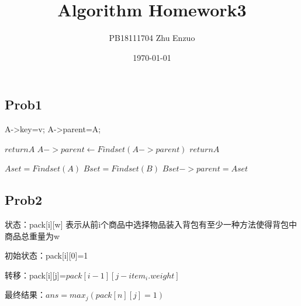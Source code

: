 \documentclass{ctexart}
\title{Algorithm Homework3}
\author{PB18111704 Zhu Enzuo}
\date{\today}
\begin{document}
\maketitle
\subsection{Prob1}
\begin{algorithm}
    \begin{algorithmic}[1]
        \State A->key=v;
        \State A->parent=A;
    \EndProcedure
    \end{algorithmic}
\end{algorithm}
\begin{algorithm}
    \begin{algorithmic}
                \State $return A$
            \Else
                \State $A->parent\gets Findset(A->parent)$
                \State $return A$
            \EndIf
        \EndProcedure
    \end{algorithmic}
\end{algorithm}
\begin{algorithm}
    \begin{algorithmic}
            \State $Aset=Findset(A)$
            \State $Bset=Findset(B)$
            \State $Bset->parent=Aset$
        \EndProcedure
    \end{algorithmic}
\end{algorithm}
\subsection{Prob2}

状态：pack[i][w] 表示从前i个商品中选择物品装入背包有至少一种方法使得背包中商品总重量为w

初始状态：pack[i][0]=1

转移：pack[i][j]=$pack[i-1][j-item_i.weight]$

最终结果：$ans=max_j(pack[n][j]=1)$
\end{document}

